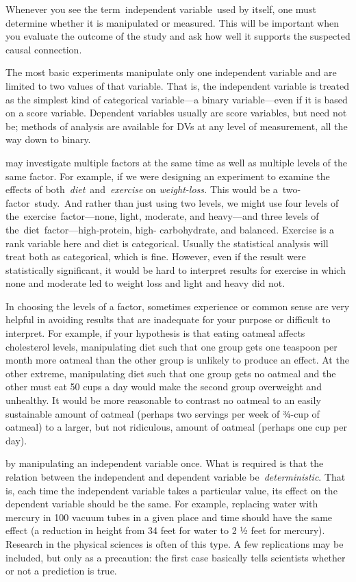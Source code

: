 \begin{refsection}
Whenever you see the term independent variable used by itself, one must determine whether it is manipulated or measured. This will be important when you evaluate the outcome of the study and ask how well it supports the suspected causal connection.

The most basic experiments manipulate only one independent variable and are limited to two values of that variable. That is, the independent variable is treated as the simplest kind of categorical variable---a binary variable---even if it is based on a score variable. Dependent variables usually are score variables, but need not be; methods of analysis are available for DVs at any level of measurement, all the way down to binary. 

 may investigate multiple factors at the same time as well as multiple levels of the same factor. For example, if we were designing an experiment to examine the effects of both \emph{diet} and \emph{exercise} on \emph{weight-loss.} This would be a two-factor study. And rather than just using two levels, we might use four levels of the exercise factor---none, light, moderate, and heavy---and three levels of the diet factor---high-protein, high- carbohydrate, and balanced. Exercise is a rank variable here and diet is categorical. Usually the statistical analysis will treat both as categorical, which is fine. However, even if the result were statistically significant, it would be hard to interpret results for exercise in which none and moderate led to weight loss and light and heavy did not.

In choosing the levels of a factor, sometimes experience or common sense are very helpful in avoiding results that are inadequate for your purpose or difficult to interpret. For example, if your hypothesis is that eating oatmeal affects cholesterol levels, manipulating diet such that one group gets one teaspoon per month more oatmeal than the other group is unlikely to produce an effect. At the other extreme, manipulating diet such that one group gets no oatmeal and the other must eat 50 cups a day would make the second group overweight and unhealthy. It would be more reasonable to contrast no oatmeal to an easily sustainable amount of oatmeal (perhaps two servings per week of ¾-cup of oatmeal) to a larger, but not ridiculous, amount of oatmeal (perhaps one cup per day).

 by manipulating an independent variable once. What is required is that the relation between the independent and dependent variable be \emph{deterministic}. That is, each time the independent variable takes a particular value, its effect on the dependent variable should be the same. For example, replacing water with mercury in 100 vacuum tubes in a given place and time should have the same effect (a reduction in height from 34 feet for water to 2 ½ feet for mercury). Research in the physical sciences is often of this type. A few replications may be included, but only as a precaution: the first case basically tells scientists whether or not a prediction is true.


\end{refsection}
